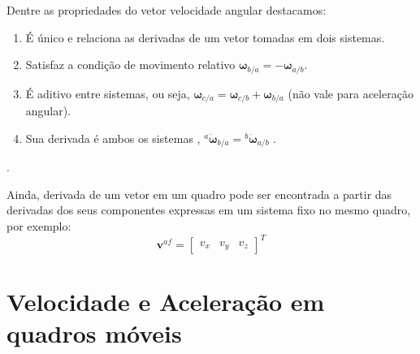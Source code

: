 Dentre as propriedades do vetor velocidade angular destacamos\footnotemark{}:
\begin{enumerate}[label=\alph*)]
\item É único e relaciona as derivadas de um vetor tomadas em dois sistemas.
\item Satisfaz a condição de movimento relativo \(\mathbf{\omega}_{b/a} = - \mathbf{\omega}_{a/b}\).
\item É aditivo entre sistemas, ou seja, \(\mathbf{\omega}_{c/a} = \!\mathbf{\omega}_{c/b} + \mathbf{\omega}_{b/a}\) (não vale para aceleração angular).
\item Sua derivada é ambos os sistemas , \({^{a}\dot{\mathbf{\omega}}_{b/a}} = {^{b}\dot{\mathbf{\omega}}_{a/b}} \) .
\end{enumerate}
.

Ainda, derivada de um vetor em um quadro pode ser encontrada a partir das derivadas dos seus componentes expressas em um sistema fixo no mesmo quadro, por exemplo:
\begin{equation*}
    \mathbf{v}^{a\!f} = \begin{bmatrix} v_{x} & v_{y} & v_{z} \end{bmatrix}^{T}
\end{equation*}

%

\section{Velocidade e Aceleração em quadros móveis}

